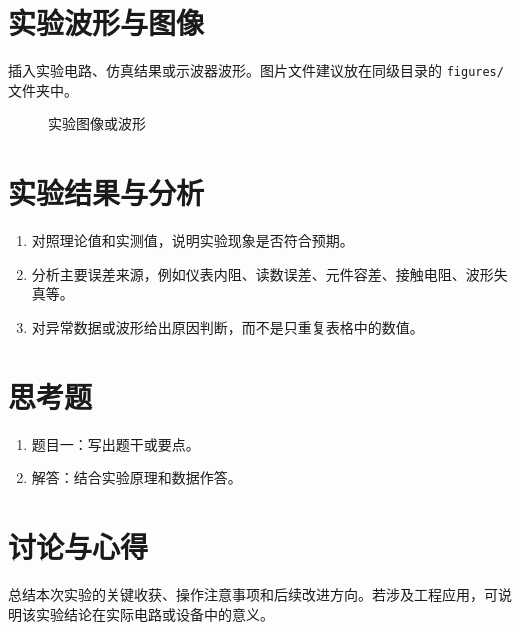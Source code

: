 \documentclass[10.5pt,a4paper]{ctexart}
\begin{document}
\section{实验波形与图像}
插入实验电路、仿真结果或示波器波形。图片文件建议放在同级目录的 \texttt{figures/} 文件夹中。

\begin{figure}[H]
  \centering
  \caption{实验图像或波形}
  \label{fig:example}
\end{figure}

\section{实验结果与分析}
\begin{enumerate}
  \item 对照理论值和实测值，说明实验现象是否符合预期。
  \item 分析主要误差来源，例如仪表内阻、读数误差、元件容差、接触电阻、波形失真等。
  \item 对异常数据或波形给出原因判断，而不是只重复表格中的数值。
\end{enumerate}

\section{思考题}
\begin{enumerate}
  \item 题目一：写出题干或要点。
  \item 解答：结合实验原理和数据作答。
\end{enumerate}

\section{讨论与心得}
总结本次实验的关键收获、操作注意事项和后续改进方向。若涉及工程应用，可说明该实验结论在实际电路或设备中的意义。
\end{document}
